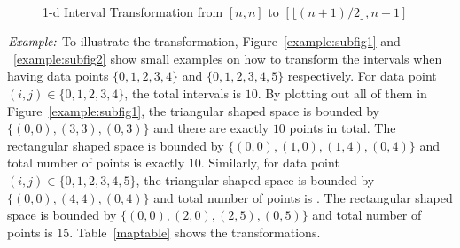 \documentclass[AMA,LATO1COL]{WileyNJD-v2}
\begin{document}
\begin{figure}[h]
\centering
{}
~~
\caption{1-d Interval Transformation from $[n,n]$ to $[\lfloor (n+1)/2 \rfloor,n+1]$}\label{modelBF}
\end{figure}

$\noindent \textit {Example:}$ To illustrate the transformation, Figure~\ref{example:subfig1} and ~\ref{example:subfig2} show small examples on how to transform the intervals when having data points $\{0,1,2,3,4\}$ and $\{0,1,2,3,4,5\}$ respectively. For data point $(i,j)\in \{0,1,2,3,4\}$, the total intervals is $10$. By plotting out all of them in Figure~\ref{example:subfig1}, the triangular shaped space is bounded by $\{(0,0), (3,3), (0,3)\}$ and there are exactly $10$ points in total. The rectangular shaped space is bounded by $\{(0,0),(1,0), (1,4),(0,4)\}$ and total number of points is exactly $10$. Similarly, for data point $(i,j)\in \{0,1,2,3,4,5\}$,  the triangular shaped space is bounded by $\{(0,0),(4,4),(0,4)\}$ and total number of points is . The rectangular shaped space is bounded by $\{(0,0),(2,0),(2,5),(0,5)\}$ and total number of points is $15$. Table~\ref{maptable} shows the transformations.
\end{document}
